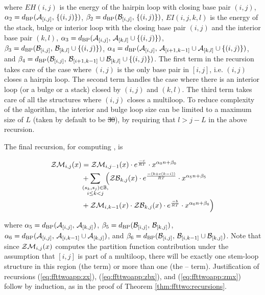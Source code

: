 \documentclass[11pt, oneside]{Thesis} %
\providecommand{\DIFadd}[1]{{\protect\color{blue}\uwave{#1}}} %
\providecommand{\DIFdel}[1]{{\protect\color{red}\sout{#1}}}                      %
\providecommand{\DIFaddbegin}{} %
\providecommand{\DIFaddend}{} %
\providecommand{\DIFdelbegin}{} %
\providecommand{\DIFdelend}{} %
\begin{document}
where
$EH(i,j)$ is the energy of the hairpin loop with closing base pair $(i,j)$,
$\alpha_2 = d_{\text{BP}}(\mathcal A_{[i,j]},\,\{(i,j)\})$,
$\beta_2 = d_{\text{BP}}(\mathcal B_{[i,j]},\,\{(i,j)\})$,
$EI(i,j,k,l)$ is the energy of the stack, bulge or
interior loop with the closing base pair $(i,j)$ and the interior
base pair $(k,l)$,
$\alpha_3 = d_{\text{BP}}(\mathcal A_{[i,j]},\,\mathcal A_{[k,l]} \cup \{(i,j)\})$,
$\beta_3 = d_{\text{BP}}(\mathcal B_{[i,j]},\,\mathcal B_{[k,l]} \cup \{(i,j)\})$,
$\alpha_4 = d_{\text{BP}}(\mathcal A_{[i,j]},\,\mathcal A_{[i+1,k-1]} \cup
\mathcal A_{[k,l]} \cup\{(i,j)\})$, and
$\beta_4 = d_{\text{BP}}(\mathcal B_{[i,j]},\,\mathcal B_{[i+1,k-1]} \cup
\mathcal B_{[k,l]} \cup\{(i,j)\})$.
The first term in the
recursion takes care of the case where $(i,j)$ is the only base pair
in $[i,j]$, i.e. $(i,j)$ closes a hairpin loop. The second term
handles the case where there is an interior loop (or a bulge or a
stack) closed by $(i,j)$ and $(k,l)$. The third term takes care of
all the structures where $(i,j)$ closes a multiloop. To reduce
complexity of the algorithm, the interior and bulge loop size can be
limited to a maximum size of $L$ (taken by default to be \DIFdelbegin \DIFdel{30}\DIFdelend \DIFaddbegin \DIFadd{$30$}\DIFaddend ),
by requiring that $l>j-L$ in the above recursion.

The final recursion, for computing \emZM{}, is

\begin{align}
\label{eq:ffttwoapp:zmx}
\begin{split}
\emZM{i,j} &= \emZM{i,j-1} \cdot \boltzE{c} \cdot x^{\ab{0}} \\
&+ \sum_{\mathclap{\substack{(s_k,s_j) \in \bpSet, \\ i \leq k < j }}}\enspace
\Big( \emZB{k,j} \cdot \boltzE{(b+c(k-i))} \cdot x^{\ab{5}} \\
&+ \emZM{i,k-1} \cdot \emZB{k,j} \cdot \boltzE{b} \cdot x^{\ab{6}} \Big)
\end{split}
\end{align}

where
$\alpha_5 = d_{\text{BP}}(\mathcal A_{[i,j]},\,\mathcal A_{[k,j]})$,
$\beta_5 = d_{\text{BP}}(\mathcal B_{[i,j]},\,\mathcal B_{[k,j]})$,
$\alpha_6 =d_{\text{BP}}(\mathcal A_{[i,j]},\,\mathcal A_{[i,k-1]} \cup \mathcal A_{[k,j]})$, and
$\beta_6 =d_{\text{BP}}(\mathcal B_{[i,j]},\,\mathcal B_{[i,k-1]} \cup \mathcal B_{[k,j]})$.
Note that since $\mathcal{ZM}_{i,j}(x)$ computes the partition function
contribution under the assumption that $[i,j]$ is part of a
multiloop, there will be exactly one stem-loop structure in this
region (the \emZB{} term) or
more than one (the \emZM{}--\emZB{} term).
Justification of recursions (\ref{eq:ffttwoapp:zx}),
(\ref{eq:ffttwoapp:zbx}), and
(\ref{eq:ffttwoapp:zmx})
follow by induction, as in the proof of Theorem \ref{thm:ffttwo:recursions}.
\end{document}
